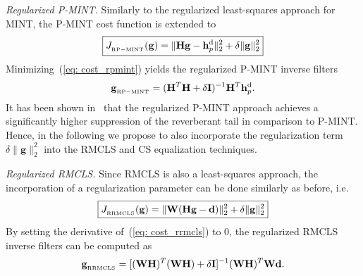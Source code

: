 \documentclass{article}
\begin{document}
\smallskip \noindent \textit{Regularized P-MINT.} \enspace Similarly to the regularized least-squares approach for MINT, the P-MINT cost function is extended to~\cite{Kodrasi_ICASSP_2012}
\begin{equation}
\label{eq: cost_rpmint}
\boxed{J_{{}_{\rm RP-MINT}}(\mathbf{g}) = \|\mathbf{H}\mathbf{g} - \mathbf{h}_p^{\rm d}\|_2^2 + \delta \|\mathbf{g} \|_2^2}
\end{equation}
Minimizing~(\ref{eq: cost_rpmint}) yields the regularized P-MINT inverse filters
\begin{equation}
\mathbf{g}_{{}_{\rm RP-MINT}}  = (\mathbf{H}^T\mathbf{H}+\delta \mathbf{I})^{-1}\mathbf{H}^{T}\mathbf{h}_p^{\rm d}.
\end{equation}
It has been shown in~\cite{Kodrasi_ICASSP_2012} that the regularized P-MINT approach achieves a significantly higher suppression of the reverberant tail in comparison to P-MINT.
Hence, in the following we propose to also incorporate the regularization term $\delta \|\mathbf{g} \|_2^2$ into the RMCLS and CS equalization techniques.

\smallskip \noindent \textit{Regularized RMCLS.} \enspace Since RMCLS is also a least-squares approach, the incorporation of a regularization parameter can be done similarly as before, i.e.
\begin{equation}
\label{eq: cost_rrmcls}
\boxed{J_{{}_{\rm RRMCLS}}(\mathbf{g}) =  \|\mathbf{W}({\mathbf{H}}\mathbf{g} - \mathbf{d})\|_2^2 + \delta \|\mathbf{g} \|_2^2}
\end{equation}
By setting the derivative of~(\ref{eq: cost_rrmcls}) to $0$, the regularized RMCLS inverse filters can be computed as
\begin{equation}
\mathbf{g}_{{}_{\rm RRMCLS}}  = [(\mathbf{W}\mathbf{H})^T(\mathbf{W}\mathbf{H}) + \delta \mathbf{I}]^{-1} (\mathbf{W}\mathbf{H})^T \mathbf{W}\mathbf{d.}
\end{equation}
\end{document}
